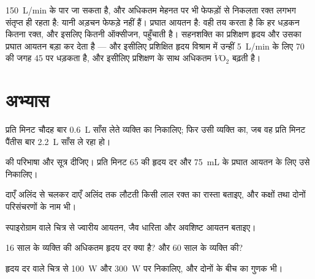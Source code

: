 \begin{remark}[सीमा है कहाँ]\label{rem:g10:heart-lungs-effort:limit}
 \qty{150}{L/min} के पार जा सकता है, और अधिकतम मेहनत पर भी
फेफड़ों से निकलता रक्त लगभग संतृप्त ही रहता है: यानी अड़चन फेफड़े नहीं
हैं। प्रघात आयतन है: वही तय करता है कि हर धड़कन कितना रक्त, और इसलिए
कितनी ऑक्सीजन, पहुँचाती है। सहनशक्ति का प्रशिक्षण हृदय और उसका प्रघात
आयतन बड़ा कर देता है --- और इसीलिए प्रशिक्षित हृदय विश्राम में उन्हीं
\qty{5}{L/min} के लिए 70 की जगह 45 पर धड़कता है, और इसीलिए प्रशिक्षण के
साथ अधिकतम $\dot V\!\mathrm{O_2}$ बढ़ती है।
\end{remark}

\section{अभ्यास}

\begin{exercise}[$\star$]\label{exo:g10:heart-lungs-effort:1}
प्रति मिनट चौदह बार \qty{0.6}{L} साँस लेते व्यक्ति का  निकालिए;
फिर उसी व्यक्ति का, जब वह प्रति मिनट पैंतीस बार \qty{2.2}{L} साँस ले
रहा हो।
\end{exercise}

\begin{exercise}[$\star$]\label{exo:g10:heart-lungs-effort:2}
 की परिभाषा और सूत्र दीजिए। प्रति मिनट 65 की हृदय दर और
\qty{75}{mL} के प्रघात आयतन के लिए उसे निकालिए।
\end{exercise}

\begin{exercise}[$\star$]\label{exo:g10:heart-lungs-effort:3}
दाएँ अलिंद से चलकर दाएँ अलिंद तक लौटती किसी लाल रक्त  का रास्ता
बताइए, और कक्षों तथा दोनों परिसंचरणों के नाम भी।
\end{exercise}

\begin{exercise}[$\star$]\label{exo:g10:heart-lungs-effort:4}
स्पाइरोग्राम वाले चित्र से ज्वारीय आयतन, जैव धारिता और अवशिष्ट आयतन
बताइए।
\end{exercise}

\begin{exercise}[$\star$]\label{exo:g10:heart-lungs-effort:5}
16 साल के व्यक्ति की अधिकतम हृदय दर क्या है? और 60 साल के व्यक्ति की?
\end{exercise}

\begin{exercise}[$\star\star$]\label{exo:g10:heart-lungs-effort:6}
हृदय दर वाले चित्र से \qty{100}{W} और \qty{300}{W} पर 
निकालिए, और दोनों के बीच का गुणक भी।
\end{exercise}


